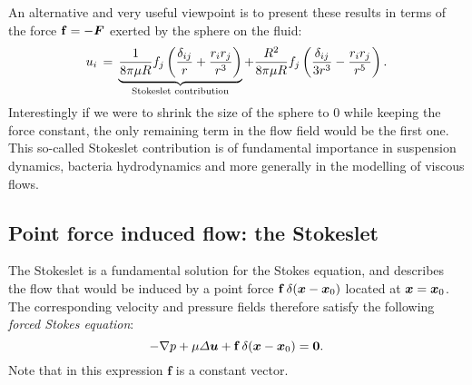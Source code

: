 An alternative and very useful viewpoint is to present these results in terms of the force $\mathbf f=-\bF$ exerted by the sphere on the fluid:
\begin{equation}
u_i \,=\, \underbrace{\frac{1}{8 \pi\mu R}f_j\left(\frac{\delta_{ij}}{r}+\frac{r_ir_j}{r^3}\right)}_\text{Stokeslet contribution} +\frac{R^2}{8\pi\mu R}f_j\left(\frac{\delta_{ij}}{3r^3}-\frac{r_ir_j}{r^5}\right).
\end{equation}
Interestingly if we were to shrink the size of the sphere to 0 while keeping the force constant, the only remaining term in the flow field would be the first one. This so-called Stokeslet contribution is of fundamental importance in suspension dynamics, bacteria hydrodynamics and more generally in the modelling of viscous flows.
\subsection{Point force induced flow: the Stokeslet}
The Stokeslet is a fundamental solution for the Stokes equation, and describes the flow that would be induced by a point force $\mathbf f\, \delta(\bx-\bx_0)$ located at $\bx = \bx_0$. The corresponding velocity and pressure fields therefore satisfy the following \textit{forced Stokes equation}:
\begin{equation}
-\nabla p + \mu \Delta \bu + \mathbf f \,\delta(\bx-\bx_0) = \matrixsym 0.
\label{eq:forced_stokes_equation}
\end{equation}
Note that in this expression $\mathbf f$ is a constant vector. 

